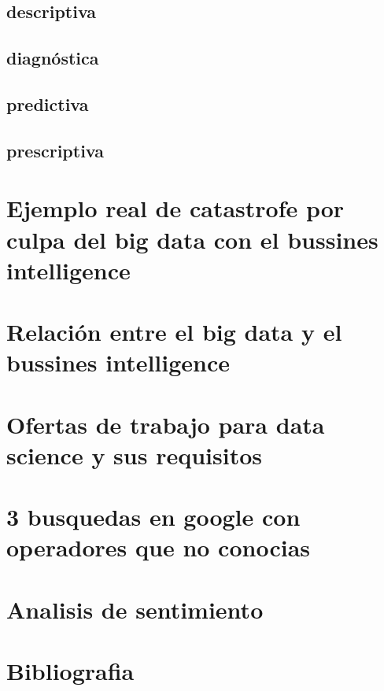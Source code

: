 \documentclass[12pt]{article}
\begin{document}
\subsection{descriptiva}
\subsection{diagnóstica}
\subsection{predictiva}
\subsection{prescriptiva}


\section{Ejemplo real de catastrofe por culpa del big data con el bussines intelligence}

\section{Relación entre el big data y el bussines intelligence}

\section{Ofertas de trabajo para data science y sus requisitos}

\section{3 busquedas en google con operadores que no conocias}

\section{Analisis de sentimiento}


\clearpage

\section{Bibliografia}

\cite{Estructuracion_de_datos}

\printbibliography
\end{document}
